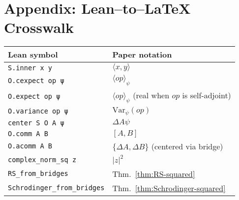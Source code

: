 \documentclass[11pt]{article}
\newcommand{\ip}[2]{\langle #1, #2 \rangle}
\newcommand{\E}[1]{\langle #1 \rangle}
\newcommand{\comm}[2]{[#1, #2]}
\newcommand{\acomm}[2]{\{#1, #2\}} %
\newcommand{\absC}[1]{\left| #1 \right|}
\newcommand{\Var}{\mathrm{Var}}
\theoremstyle{plain}
\theoremstyle{definition}
\theoremstyle{remark}
\begin{document}
\section*{Appendix: Lean--to--LaTeX Crosswalk}

\begin{center}
\begin{tabular}{ll}
\toprule
\textbf{Lean symbol} & \textbf{Paper notation} \\
\midrule
\verb|S.inner x y| & $\ip{x}{y}$ \\
\verb|O.cexpect op ψ| & $\E{op}_\psi$ \\
\verb|O.expect op ψ| & $\E{op}_\psi$ (real when $op$ is self-adjoint) \\
\verb|O.variance op ψ| & $\Var_\psi(op)$ \\
\verb|center S O A ψ| & $\Delta A\psi$ \\
\verb|O.comm A B| & $\comm{A}{B}$ \\
\verb|O.acomm A B| & $\acomm{\Delta A}{\Delta B}$ (centered via bridge) \\
\verb|complex_norm_sq z| & $\absC{z}^2$ \\
\verb|RS_from_bridges| & Thm.~\ref{thm:RS-squared} \\
\verb|Schrodinger_from_bridges| & Thm.~\ref{thm:Schrodinger-squared} \\
\bottomrule
\end{tabular}
\end{center}
\end{document}
